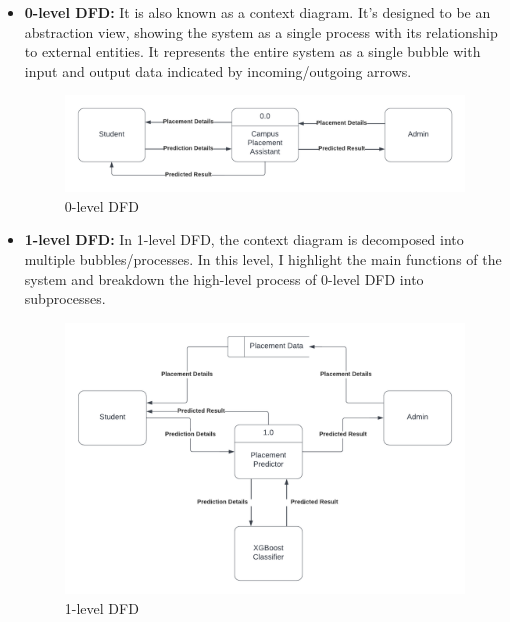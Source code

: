 \documentclass[12pt]{article}
\begin{document}
\begin{itemize}

\item \textbf{0-level DFD: }
It is also known as a context diagram. It’s designed to be an abstraction view, showing the system as a single process with its relationship to external entities. It represents the entire system as a single bubble with input and output data indicated by incoming/outgoing arrows. 

\begin{figure}[H]
\begin{center}
\includegraphics[scale=0.8]{0-LEVEL DFD}
\caption{0-level DFD}
\end{center}
\end{figure}

\item \textbf{1-level DFD: }
In 1-level DFD, the context diagram is decomposed into multiple bubbles/processes. In this level, I highlight the main functions of the system and breakdown the high-level process of 0-level DFD into subprocesses. 

\begin{figure}[H]
\begin{center}
\includegraphics[scale=.8]{1-LEVEL DFD}
\caption{1-level DFD}
\end{center}
\end{figure}


\end{itemize}
\end{document}
